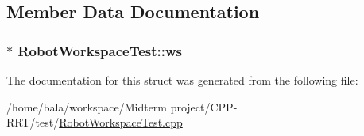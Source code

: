 \subsection{Member Data Documentation}
\subsubsection[{\texorpdfstring{ws}{ws}}]{$\ast$ Robot\+Workspace\+Test\+::ws}\hypertarget{structRobotWorkspaceTest_a73b830760a8bdd06651032ec7adf83e9}{}\label{structRobotWorkspaceTest_a73b830760a8bdd06651032ec7adf83e9}


The documentation for this struct was generated from the following file\+:\begin{DoxyCompactItemize}
\item 
/home/bala/workspace/\+Midterm project/\+C\+P\+P-\/\+R\+R\+T/test/\hyperlink{RobotWorkspaceTest_8cpp}{Robot\+Workspace\+Test.\+cpp}\end{DoxyCompactItemize}
